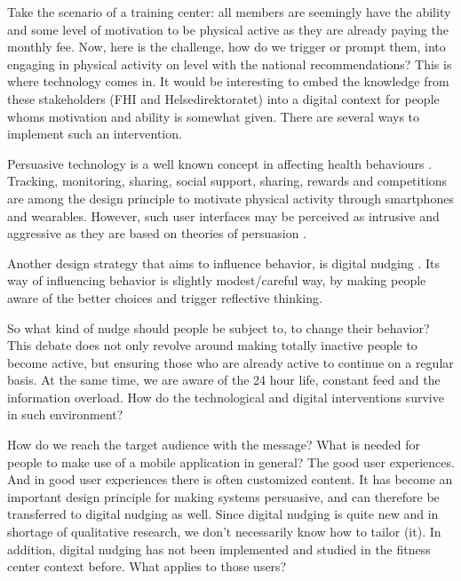 Take the scenario of a training center: all members are seemingly have the ability and some level of motivation to be physical active as they are already paying the monthly fee. Now, here is the challenge, how do we trigger or prompt them, into engaging in physical activity on level with the national recommendations? This is where technology comes in. It would be interesting to embed the knowledge from these stakeholders (FHI and Helsedirektoratet) into a digital context for people whoms motivation and ability is somewhat given. There are several ways to implement such an intervention. 
 


Persuasive technology is a well known concept in affecting health behaviours \cite{orji_persuasive_2018}.
Tracking, monitoring, sharing, social support, sharing, rewards and competitions are among the design principle to motivate physical activity through smartphones and wearables. However, such user interfaces may be perceived as intrusive and aggressive as they are based on theories of persuasion \cite{meske_status_2019}. 

Another design strategy that aims to influence behavior, is digital nudging . Its way of influencing behavior is slightly modest/careful way, by making people aware of the better choices and trigger reflective thinking\cite{meske_status_2019}.

So what kind of nudge should people be subject to, to change their behavior? This debate does not only revolve around making totally inactive people to become active, but ensuring those who are already active to continue on a regular basis. At the same time, we are aware of the 24 hour life, constant feed and the information overload. How do the technological and digital interventions survive in such environment? 

How do we reach the target audience with the message? What is needed for people to make use of a mobile application in general? The good user experiences. And in good user experiences there is often customized content. It has become an important design principle for making systems persuasive, and can therefore be transferred to digital nudging as well. Since digital nudging is quite new and in shortage  of qualitative research, we don't necessarily know how to tailor (it). In addition, digital nudging has not been implemented and studied in the fitness center context before. What applies to those users?


